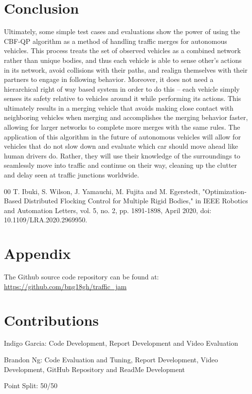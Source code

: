 \documentclass[conference]{IEEEtran}
\begin{document}
\section{Conclusion}
Ultimately, some simple test cases and evaluations show the power of using the CBF-QP algorithm as a method of handling traffic merges for autonomous vehicles. This process treats the set of observed vehicles as a combined network rather than unique bodies, and thus each vehicle is able to sense other’s actions in its network, avoid collisions with their paths, and realign themselves with their partners to engage in following behavior. Moreover, it does not need a hierarchical right of way based system in order to do this – each vehicle simply senses its safety relative to vehicles around it while performing its actions. This ultimately results in a merging vehicle that avoids making close contact with neighboring vehicles when merging and accomplishes the merging behavior faster, allowing for larger networks to complete more merges with the same rules. The application of this algorithm in the future of autonomous vehicles will allow for vehicles that do not slow down and evaluate which car should move ahead like human drivers do. Rather, they will use their knowledge of the surroundings to seamlessly move into traffic and continue on their way, cleaning up the clutter and delay seen at traffic junctions worldwide.


\begin{thebibliography}{00}
 T. Ibuki, S. Wilson, J. Yamauchi, M. Fujita and M. Egerstedt, "Optimization-Based Distributed Flocking Control for Multiple Rigid Bodies," in IEEE Robotics and Automation Letters, vol. 5, no. 2, pp. 1891-1898, April 2020, doi: 10.1109/LRA.2020.2969950.
\end{thebibliography}

\section*{Appendix}
The Github source code repository can be found at: 
\href{https://github.com/bng18gh/traffic\_jam}{https://github.com/bng18gh/traffic\_jam}


\section*{Contributions}
Indigo Garcia: Code Development, Report Development and Video Evaluation

Brandon Ng: Code Evaluation and Tuning, Report Development, Video Development, GitHub Repository and ReadMe Development

Point Split: 50/50
\end{document}
